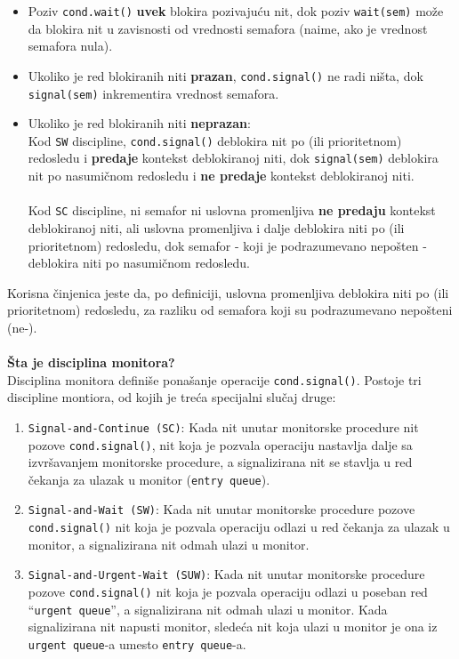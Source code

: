 \begin{itemize}
    \item Poziv \texttt{cond.wait()} \textbf{uvek} blokira pozivaju\'{c}u nit, dok poziv \texttt{wait(sem)} mo\v{z}e da blokira nit u zavisnosti od vrednosti semafora (naime, ako je vrednost semafora nula).
    \item Ukoliko je red blokiranih niti \textbf{prazan}, \texttt{cond.signal()} ne radi ni\v{s}ta, dok \texttt{signal(sem)} inkrementira vrednost semafora.
    \item Ukoliko je red blokiranih niti \textbf{neprazan}: \\Kod \texttt{SW} discipline, \texttt{cond.signal()} deblokira nit po  (ili prioritetnom) redosledu i \textbf{predaje} kontekst deblokiranoj niti, dok \texttt{signal(sem)} deblokira nit po nasumi\v{c}nom redosledu i \textbf{ne predaje} kontekst deblokiranoj niti.\\\\Kod \texttt{SC} discipline, ni semafor ni uslovna promenljiva \textbf{ne predaju} kontekst deblokiranoj niti, ali uslovna promenljiva i dalje deblokira niti po  (ili prioritetnom) redosledu, dok semafor - koji je podrazumevano nepo\v{s}ten - deblokira niti po nasumi\v{c}nom redosledu. 
\end{itemize}
Korisna \v{c}injenica jeste da, po definiciji, uslovna promenljiva deblokira niti po  (ili prioritetnom) redosledu, za razliku od semafora koji su podrazumevano nepo\v{s}teni (ne-).
\\\\
\textbf{\v{S}ta je disciplina monitora?}\\
Disciplina monitora defini\v{s}e pona\v{s}anje operacije \texttt{cond.signal()}. Postoje tri discipline montiora, od kojih je tre\'{c}a specijalni slu\v{c}aj druge:
\begin{enumerate}
    \item \texttt{Signal-and-Continue (SC)}: Kada nit unutar monitorske procedure nit pozove \texttt{cond.signal()}, nit koja je pozvala operaciju nastavlja dalje sa izvr\v{s}avanjem monitorske procedure, a signalizirana nit se stavlja u red \v{c}ekanja za ulazak u monitor (\texttt{entry queue}).
    \item \texttt{Signal-and-Wait (SW)}: Kada nit unutar monitorske procedure pozove \texttt{cond.signal()} nit koja je pozvala operaciju odlazi u red \v{c}ekanja za ulazak u monitor, a signalizirana nit odmah ulazi u monitor.
    \item \texttt{Signal-and-Urgent-Wait (SUW)}:  Kada nit unutar monitorske procedure pozove \texttt{cond.signal()} nit koja je pozvala operaciju odlazi u poseban red ``\texttt{urgent queue}'', a signalizirana nit odmah ulazi u monitor. Kada signalizirana nit napusti monitor, slede\'{c}a nit koja ulazi u monitor je ona iz \texttt{urgent queue}-a umesto \texttt{entry queue}-a.
\end{enumerate}
